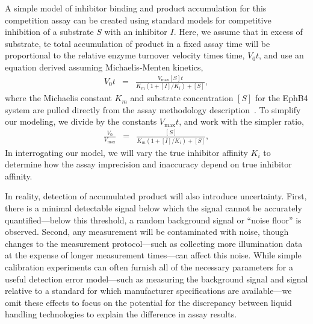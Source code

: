 \documentclass[aps,pre,twocolumn,nofootinbib,superscriptaddress,linenumbers]{revtex4-1}
\begin{document}
A simple model of inhibitor binding and product accumulation for this competition assay can be created using standard models for competitive inhibition of a substrate $S$ with an inhibitor $I$. 
Here, we assume that in excess of substrate, te total accumulation of product in a fixed assay time will be proportional to the relative enzyme turnover velocity times time, $V_0 t$, and use an equation derived assuming Michaelis-Menten kinetics,
\begin{eqnarray}
V_{0} t &=& \frac{V_\mathrm{max} [S] t}{K_{m}\left(1+[I]/K_{i}\right)+[S]} ,
\end{eqnarray}
where the Michaelis constant $K_{m}$ and substrate concentration $[S]$ for the EphB4 system are pulled directly from the assay methodology description~\cite{barlaam_novel_2009,barlaam_pyrimidine_2010}.
To simplify our modeling, we divide by the constants $V_\mathrm{max} t$, and work with the simpler ratio,
\begin{eqnarray}
\frac{V_{0}}{V_\mathrm{max}} &=& \frac{[S]}{K_{m}\left(1+[I]/K_{i}\right)+[S]} \label{equation:competitive-inhibition} ,
\end{eqnarray}
In interrogating our model, we will vary the true inhibitor affinity $K_{i}$ to determine how the assay imprecision and inaccuracy depend on true inhibitor affinity.

In reality, detection of accumulated product will also introduce uncertainty.
First, there is a minimal detectable signal below which the signal cannot be accurately quantified---below this threshold, a random background signal or ``noise floor'' is observed.
Second, any measurement will be contaminated with noise, though changes to the measurement protocol---such as collecting more illumination data at the expense of longer measurement times---can affect this noise.
While simple calibration experiments can often furnish all of the necessary parameters for a useful detection error model---such as measuring the background signal and signal relative to a standard for which manufacturer specifications are available---we omit these effects to focus on the potential for the discrepancy between liquid handling technologies to explain the difference in assay results.
\end{document}
